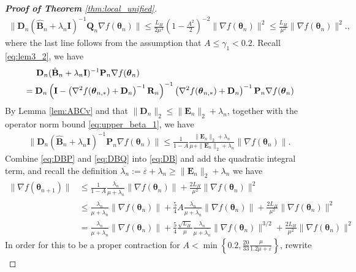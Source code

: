 \documentclass[11pt]{amsart}
\theoremstyle{plain}
\theoremstyle{definition}
\theoremstyle{remark}
\def\D{\mathbf{D}}
\def\bQ{\mathbf{Q}}
\def\bE{\mathbf{E}}
\def\bP{\mathbf{P}}
\def\bR{\mathbf{R}}
\def\eps{\varepsilon}
\def\B{\mathbf{B}}
\def\param{\boldsymbol{\theta}}
\begin{document}
\begin{proof}[\textbf{Proof of Theorem} \ref{thm:local_unified}]
    \begin{align}\label{eq:DBQ}
    \|\D_n(\hat{\B}_n+\lambda_n\mathbf{I})^{-1}\bQ_n\nabla f(\param_{n})\|\leq \frac{L_H}{2\mu^2}\left(1-\frac{A^2}{2}\right)^{-2}\|\nabla f(\param_n)\|^2\leq \frac{L_H}{\mu^2}\|\nabla f(\param_n)\|^2.,
    \end{align}
    where the last line follows from the assumption that $A\leq \gamma_1<0.2$.
    Recall \eqref{eq:lem3_2}, we have
    \begin{align*}
    &\hspace{0.2in}\D_n(\hat{\B}_n+\lambda_n\mathbf{I})^{-1}\bP_n\nabla f(\param_{n})\\
    &=\D_n\left(\mathbf{I}-\left(\nabla^2f(\param_{n,*})+\D_n\right)^{-1}\bR_n\right)^{-1}\left(\nabla^2f(\param_{n,*})+\D_n\right)^{-1}\bP_{n}\nabla f(\param_n)
    \end{align*}
    By Lemma \ref{lem:ABCv} and that $\|\D_n\|_2\leq \|\bE_n\|_2+\lambda_n$, together with the operator norm bound \eqref{eq:upper_beta_1}, we have
    \begin{align}\label{eq:DBP}
    \|\D_n(\hat{\B}_n+\lambda_n\mathbf{I})^{-1}\bP_n\nabla f(\param_{n})\|\leq \frac{1}{1-A}\frac{\|\bE_n\|_2+\lambda_n}{\mu+\|\bE_n\|_2+\lambda_n}\|\nabla f(\param_n)\|.
    \end{align}
    Combine \eqref{eq:DBP} and \eqref{eq:DBQ} into \eqref{eq:DB} and add the quadratic integral term, and recall the definition $\overline{\lambda_n}:=\overline{\eps}+\lambda_n\geq \|\bE_n\|_2+\lambda_n$ we have
    \begin{align}\label{eq:grad_norm_contraction}
    \|\nabla f(\param_{n+1})\|&\leq \frac{1}{1-A}\frac{\overline{\lambda_n}}{\mu+\overline{\lambda_n}}\|\nabla f(\param_n)\|+ \frac{2L_H}{\mu^2}\|\nabla f(\param_n)\|^2\\
    &\leq \frac{\overline{\lambda_n}}{\mu+\overline{\lambda_n}}\|\nabla f(\param_n)\|+\frac{5}{4}A\frac{\overline{\lambda_n}}{\mu+\overline{\lambda_n}}\|\nabla f(\param_n)\|+ \frac{2L_H}{\mu^2}\|\nabla f(\param_n)\|^2\\
    &=\frac{\overline{\lambda_n}}{\mu+\overline{\lambda_n}}\|\nabla f(\param_n)\|+\frac{5}{4}\frac{\sqrt{L_H}}{\mu}\frac{\overline{\lambda_n}}{\mu+\overline{\lambda_n}}\|\nabla f(\param_n)\|^{3/2}+ \frac{2L_H}{\mu^2}\|\nabla f(\param_n)\|^2
    \end{align}
    In order for this to be a proper contraction for $A<\min\left\{0.2,\frac{20}{33}\frac{\mu}{1.2\mu+\overline{\eps}}\right\}$, rewrite
    \begin{align*}

\end{align*}
\end{proof}
\end{document}
